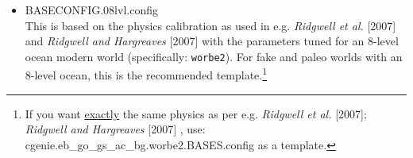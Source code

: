 \begin{itemize}[noitemsep]

\vspace{2mm}
\item \textsf{\small BASECONFIG.08lvl.config}
\vspace{1mm}
\\This is based on the physics calibration as used in e.g. \textit{Ridgwell et al.} [2007] and \textit{Ridgwell and Hargreaves} [2007] with the parameters tuned for an 8-level ocean modern world (specifically: \texttt{worbe2}). For fake and paleo worlds with an 8-level ocean, this is the recommended template.\footnote{If you want \uline{exactly} the same physics as per e.g. \textit{Ridgwell et al.} [2007];  \textit{Ridgwell and Hargreaves} [2007] , use: \linebreak\textsf{\footnotesize cgenie.eb\_go\_gs\_ac\_bg.worbe2.BASES.config} as a template.}

\pagebreak


\end{itemize}
